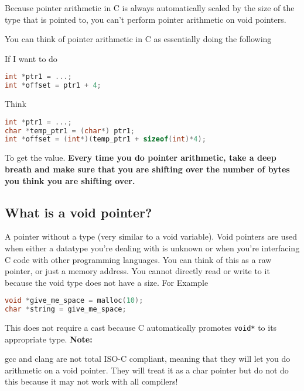 Because pointer arithmetic in C is always automatically scaled by the
size of the type that is pointed to, you can't perform pointer
arithmetic on void pointers.

You can think of pointer arithmetic in C as essentially doing the
following

If I want to do

\begin{lstlisting}[language=C]
int *ptr1 = ...;
int *offset = ptr1 + 4;
\end{lstlisting}

Think

\begin{lstlisting}[language=C]
int *ptr1 = ...;
char *temp_ptr1 = (char*) ptr1;
int *offset = (int*)(temp_ptr1 + sizeof(int)*4);
\end{lstlisting}

To get the value. \textbf{Every time you do pointer arithmetic, take a
deep breath and make sure that you are shifting over the number of bytes
you think you are shifting over.}

\subsection{What is a void pointer?}\label{what-is-a-void-pointer}

A pointer without a type (very similar to a void variable). Void pointers are used when either a datatype you're dealing with is unknown or when you're interfacing C code with other programming languages. You can think of this as a raw pointer, or just a memory address. You cannot directly read or write to it because the void type does not have a size. For Example

\begin{lstlisting}[language=C]
void *give_me_space = malloc(10);
char *string = give_me_space;
\end{lstlisting}

This does not require a cast because C automatically promotes
\texttt{void*} to its appropriate type. \textbf{Note:}

gcc and clang are not total ISO-C compliant, meaning that they will let
you do arithmetic on a void pointer. They will treat it as a char
pointer but do not do this because it may not work with all compilers!

